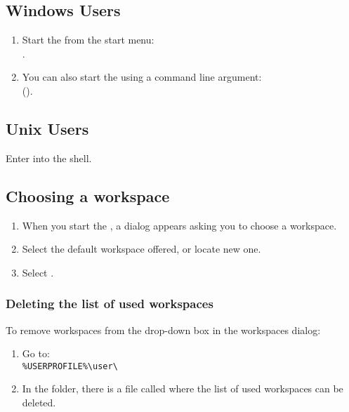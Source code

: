 

\subsection{Windows Users}
\begin{enumerate}
\item Start the \ite{}  from the start menu:\\
.

\item You can also start the \ite{} using a command line argument:\\ 
(). 
\end{enumerate}

\subsection{Unix Users}
Enter \bxshell{\app{}} into the shell. 

\subsection{Choosing a workspace}
\begin{enumerate}
\item When you start the \ite{}, a dialog appears asking you to choose a workspace. 
\item Select the default workspace offered, or locate new one. 
 \item Select .
 \end{enumerate}


\subsubsection{Deleting the list of used workspaces}
To remove workspaces from the drop-down box in the workspaces dialog:
\begin{enumerate}
\item Go to: \\
\verb+%USERPROFILE%\user\  +
\item In the \app{} folder, there is a file called  where the list of used workspaces can be deleted. 
\end{enumerate}




